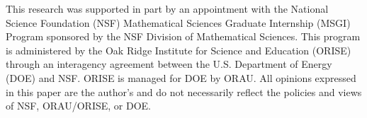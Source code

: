 \documentclass[ba]{imsart}
\theoremstyle{plain}
\theoremstyle{definition}
\theoremstyle{remark}
\begin{document}
\begin{funding} 
  This research was supported in part by an appointment with the
  National Science Foundation (NSF) Mathematical Sciences Graduate
  Internship (MSGI) Program sponsored by the NSF Division of
  Mathematical Sciences. This program is administered by the Oak Ridge
  Institute for Science and Education (ORISE) through an interagency
  agreement between the U.S. Department of Energy (DOE) and NSF. ORISE
  is managed for DOE by ORAU. All opinions expressed in this paper are
  the author's and do not necessarily reflect the policies and views
  of NSF, ORAU/ORISE, or DOE.
\end{funding}



\end{document}
